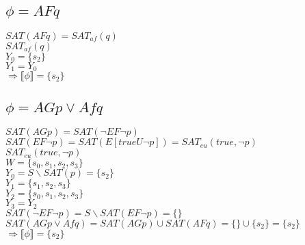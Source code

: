\documentclass[a4paper]{article}
\begin{document}
\subsection*{$\phi = AFq$}
\hspace*{5mm}$SAT(AFq) = SAT_{af}(q)$ 
\\[0.25cm] 
\hspace*{5mm}$SAT_{af}(q)$ 
\\[0.25cm] 
\hspace*{10mm}$Y_0 = \{s_2\}$
\\[0.25cm] 
\hspace*{10mm}$Y_1 = Y_0$ 
\\[0.25cm] 
\hspace*{5mm} $\Rightarrow \llbracket \phi \rrbracket = \{s_2\}$


\subsection*{$\phi = AGp \vee Afq$}
\hspace*{5mm}$SAT(AGp) = SAT(\neg EF \neg p)$ 
\\[0.25cm] 
\hspace*{5mm}$SAT(EF \neg p) = SAT(E[trueU \neg p]) = SAT_{eu}(true, \neg p)$ 
\\[0.25cm] 
\hspace*{5mm}$SAT_{eu}(true, \neg p)$ 
\\[0.25cm] 
\hspace*{10mm}$W = \{s_0,s_1,s_2,s_3\}$
\\[0.25cm] 
\hspace*{10mm}$Y_0 = S \backslash SAT(p) = \{s_2\}$
\\[0.25cm] 
\hspace*{10mm}$Y_1 = \{s_1,s_2,s_3\}$
\\[0.25cm] 
\hspace*{10mm}$Y_2 = \{s_0,s_1,s_2,s_3\}$
\\[0.25cm] 
\hspace*{10mm}$Y_3 = Y_2$
\\[0.25cm] 
\hspace*{5mm}$SAT(\neg EF \neg p) = S \backslash SAT( EF \neg p) = \{\}$ 
\\[0.25cm] 
\hspace*{5mm}$SAT(AGp \vee Afq) = SAT(AGp) \cup SAT(AFq) = \{\} \cup \{s_2\} = \{s_2\}$
\\[0.25cm] 
\hspace*{5mm} $\Rightarrow \llbracket \phi \rrbracket = \{s_2\}$
\end{document}
